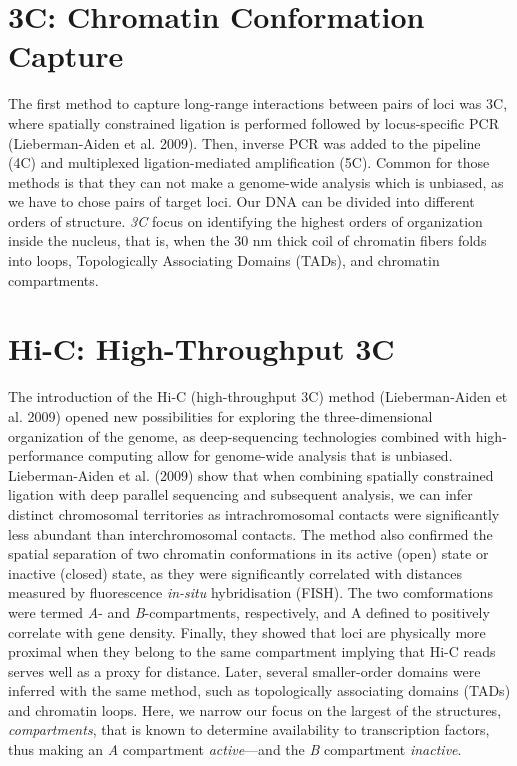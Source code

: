 \documentclass[
  11pt,
  a4paper,
]{scrbook}
\let\oldemph\emph
\renewcommand\emph[1]{\oldemph{\color{gray}#1}}
\begin{document}
\section{3C: Chromatin Conformation
Capture}\label{c-chromatin-conformation-capture}

The first method to capture long-range interactions between pairs of
loci was 3C, where spatially constrained ligation is performed followed
by locus-specific PCR (Lieberman-Aiden et al. 2009). Then, inverse PCR
was added to the pipeline (4C) and multiplexed ligation-mediated
amplification (5C). Common for those methods is that they can not make a
genome-wide analysis which is unbiased, as we have to chose pairs of
target loci. Our DNA can be divided into different orders of structure.
\emph{3C} focus on identifying the highest orders of organization inside
the nucleus, that is, when the 30 nm thick coil of chromatin fibers
folds into loops, Topologically Associating Domains (TADs), and
chromatin compartments.

\section{Hi-C: High-Throughput 3C}\label{hi-c-high-throughput-3c}

The introduction of the Hi-C (high-throughput 3C) method
(Lieberman-Aiden et al. 2009) opened new possibilities for exploring the
three-dimensional organization of the genome, as deep-sequencing
technologies combined with high-performance computing allow for
genome-wide analysis that is unbiased. Lieberman-Aiden et al. (2009)
show that when combining spatially constrained ligation with deep
parallel sequencing and subsequent analysis, we can infer distinct
chromosomal territories as intrachromosomal contacts were significantly
less abundant than interchromosomal contacts. The method also confirmed
the spatial separation of two chromatin conformations in its active
(open) state or inactive (closed) state, as they were significantly
correlated with distances measured by fluorescence \emph{in-situ}
hybridisation (FISH). The two comformations were termed \emph{A}- and
\emph{B}-compartments, respectively, and A defined to positively
correlate with gene density. Finally, they showed that loci are
physically more proximal when they belong to the same compartment
implying that Hi-C reads serves well as a proxy for distance. Later,
several smaller-order domains were inferred with the same method, such
as topologically associating domains (TADs) and chromatin loops. Here,
we narrow our focus on the largest of the structures,
\emph{compartments}, that is known to determine availability to
transcription factors, thus making an \emph{A} compartment
\emph{active}---and the \emph{B} compartment \emph{inactive}.
\end{document}
